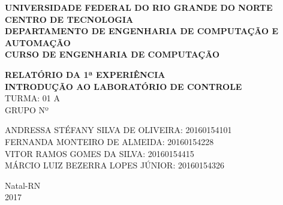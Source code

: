 \documentclass[a4paper,12pt]{article}
\begin{document}
\onehalfspacing

\thispagestyle{empty}

\setcounter{page}{1}


\begin{figure}[!ht]

\centering

\hspace{11.09cm}

\label{Logos}

\end{figure}


\vspace{-1cm}

\begin{center}
{\bf{\normalsize UNIVERSIDADE FEDERAL DO RIO GRANDE DO NORTE\\
CENTRO DE TECNOLOGIA\\
DEPARTAMENTO DE ENGENHARIA DE COMPUTAÇÃO E AUTOMAÇÃO\\
CURSO DE ENGENHARIA DE COMPUTAÇÃO
}}


\vspace{3.6cm}

{\bf{\large RELATÓRIO DA 1ª EXPERIÊNCIA\\
INTRODUÇÃO AO LABORATÓRIO DE CONTROLE\\
}}
\vspace{1.5cm}
{\large TURMA: 01 A\\
	GRUPO Nº}

\vspace{3.6cm}


\begin{flushright}
\begin{normalsize}
ANDRESSA STÉFANY SILVA DE OLIVEIRA: 20160154101\\
\vspace{0.8cm}
FERNANDA MONTEIRO DE ALMEIDA: 20160154228\\
\vspace{0.8cm}
VITOR RAMOS GOMES DA SILVA: 20160154415\\
\vspace{0.8cm}
MÁRCIO LUIZ BEZERRA LOPES JÚNIOR: 20160154326\\
\end{normalsize}
\end{flushright}


\vspace{2.5cm}

{\large Natal-RN\\
2017}

\end{center}
\end{document}
